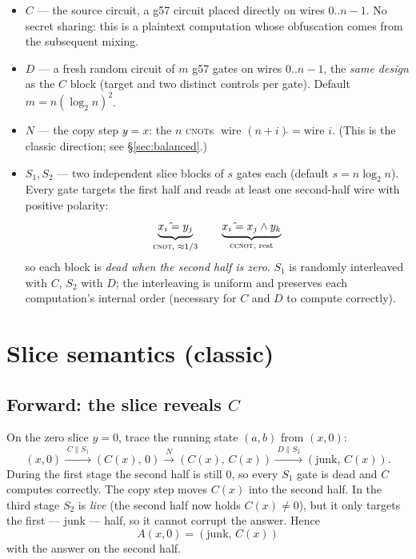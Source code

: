 \documentclass[11pt]{article}
\newcommand{\CNOT}{\textsc{cnot}}
\newcommand{\CCNOT}{\textsc{ccnot}}
\begin{document}
\begin{itemize}
\item \textbf{$C$} --- the source circuit, a g57 circuit placed directly on
wires $0..n{-}1$. No secret sharing: this is a plaintext computation whose
obfuscation comes from the subsequent mixing.
\item \textbf{$D$} --- a fresh random circuit of $m$ g57 gates on wires
$0..n{-}1$, the \emph{same design} as the $C$ block (target and two distinct
controls per gate). Default $m = n(\log_2 n)^2$.
\item \textbf{$N$} --- the copy step $y \mathrel{\hat{}}= x$: the $n$ \CNOT{}s
$\;\text{wire } (n{+}i) \mathrel{\hat{}}= \text{wire } i$. (This is the
classic direction; see \S\ref{sec:balanced}.)
\item \textbf{$S_1, S_2$} --- two independent slice blocks of $s$ gates each
(default $s = n\log_2 n$). Every gate targets the first half and reads at
least one second-half wire with positive polarity:
\[
\underbrace{x_i \mathrel{\hat{}}= y_j}_{\text{\CNOT, }\approx 1/3}
\qquad
\underbrace{x_i \mathrel{\hat{}}= x_j \wedge y_k}_{\text{\CCNOT, rest}}
\]
so each block is \emph{dead when the second half is zero}. $S_1$ is randomly
interleaved with $C$, $S_2$ with $D$; the interleaving is uniform and
preserves each computation's internal order (necessary for $C$ and $D$ to
compute correctly).
\end{itemize}

\section{Slice semantics (classic)}

\subsection{Forward: the slice reveals $C$}

On the zero slice $y=0$, trace the running state $(a,b)$ from $(x,0)$:
\[
(x,0)
\xrightarrow{\;C \parallel S_1\;} (C(x),\,0)
\xrightarrow{\;N\;} (C(x),\,C(x))
\xrightarrow{\;D \parallel S_2\;} (\text{junk},\,C(x)).
\]
During the first stage the second half is still $0$, so every $S_1$ gate is
dead and $C$ computes correctly. The copy step moves $C(x)$ into the second
half. In the third stage $S_2$ is \emph{live} (the second half now holds
$C(x)\neq 0$), but it only targets the first --- junk --- half, so it cannot
corrupt the answer. Hence
\[
\boxed{\,A(x,0) = (\text{junk},\, C(x))\,}
\]
with the answer on the second half.
\end{document}
